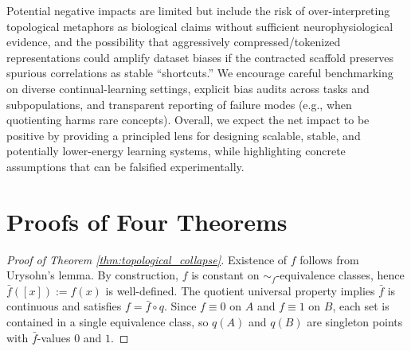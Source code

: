 \documentclass{article}
\begin{document}
Potential negative impacts are limited but include the risk of over-interpreting topological metaphors as biological claims without sufficient neurophysiological evidence, and the possibility that aggressively compressed/tokenized representations could amplify dataset biases if the contracted scaffold preserves spurious correlations as stable ``shortcuts.'' We encourage careful benchmarking on diverse continual-learning settings, explicit bias audits across tasks and subpopulations, and transparent reporting of failure modes (e.g., when quotienting harms rare concepts). Overall, we expect the net impact to be positive by providing a principled lens for designing scalable, stable, and potentially lower-energy learning systems, while highlighting concrete assumptions that can be falsified experimentally.



\newpage
\appendix

\renewcommand{\theequation}{A\arabic{equation}}
\renewcommand{\thefigure}{A\arabic{figure}}
\renewcommand{\thetable}{A\arabic{table}}
\setcounter{equation}{0}    
\setcounter{figure}{0}    
\setcounter{table}{0}    

\section{Proofs of Four Theorems}
\label{appendix:A}

\begin{proof}[Proof of Theorem \ref{thm:topological_collapse}]
Existence of $f$ follows from Urysohn's lemma.
By construction, $f$ is constant on $\sim_f$-equivalence classes, hence $\bar f([x]):=f(x)$ is well-defined.
The quotient universal property implies $\bar f$ is continuous and satisfies $f=\bar f\circ q$.
Since $f\equiv 0$ on $A$ and $f\equiv 1$ on $B$, each set is contained in a single equivalence class, so $q(A)$ and $q(B)$ are singleton points with $\bar f$-values $0$ and $1$.
\end{proof}
 
\end{document}
